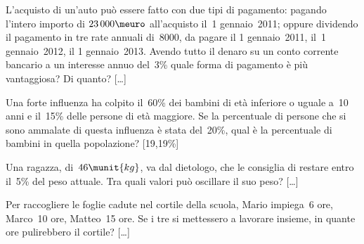 \begin{htmulticols}{2}
\begin{esercizio}
\label{ese:3.212}
L'acquisto di un'auto può essere fatto con due tipi di pagamento: pagando
l'intero importo di \(23\,000\meuro\) all'acquisto il~1{\textdegree} 
gennaio~2011; oppure
dividendo il pagamento in tre rate annuali di~8000, da pagare il
1{\textdegree} gennaio~2011, il~1{\textdegree} gennaio~2012, il
1{\textdegree} gennaio~2013. Avendo tutto il denaro su un conto
corrente bancario a un interesse annuo del~3\% quale forma di pagamento
è più vantaggiosa? Di quanto? \hfill [\dots]
\end{esercizio}

\begin{esercizio}
\label{ese:3.213}
Una forte influenza ha colpito il~60\% dei bambini di età
inferiore o uguale a~10 anni e il~15\% delle persone di età maggiore.
Se la percentuale di persone che si sono ammalate di questa influenza
è stata del~20\%, qual è la percentuale di bambini in quella
popolazione? \hfill [19,19\%]
\end{esercizio}


\begin{esercizio}
\label{ese:3.215}
 Una ragazza, di~\(46\munit{kg}\), va dal dietologo, che
le consiglia di restare entro il~5\% del peso attuale. Tra
quali valori può oscillare il suo peso? \hfill [\dots]
\end{esercizio}

\begin{esercizio}
\label{ese:3.216}
Per raccogliere le foglie cadute nel cortile
della scuola, Mario impiega~6 ore, Marco~10 ore,
Matteo~15 ore. Se i tre si mettessero a lavorare
insieme, in quante ore pulirebbero il cortile? \hfill [\dots]
\end{esercizio}
% 

\end{htmulticols}

